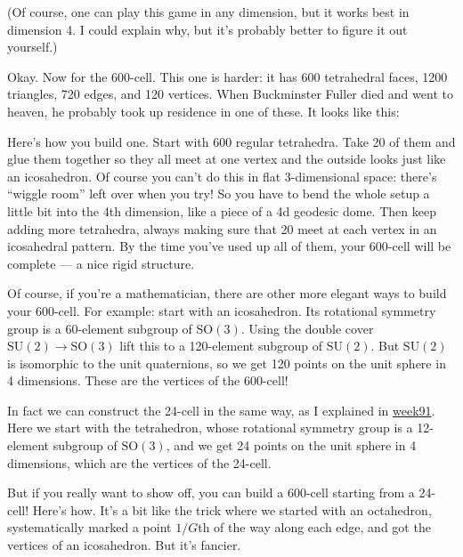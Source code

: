 \documentclass{article}
\def\tightlist{}
\renewcommand{\texttt}[1]{%
  \begingroup
  \ttfamily
  \begingroup\lccode`~=`/\lowercase{\endgroup\def~}{/\discretionary{}{}{}}%
  \begingroup\lccode`~=`[\lowercase{\endgroup\def~}{[\discretionary{}{}{}}%
  \begingroup\lccode`~=`.\lowercase{\endgroup\def~}{.\discretionary{}{}{}}%
  \catcode`/=\active\catcode`[=\active\catcode`.=\active
  \scantokens{#1\noexpand}%
  \endgroup
}
\begin{document}
(Of course, one can play this game in any dimension, but it works best
in dimension 4. I could explain why, but it's probably better to figure
it out yourself.)

Okay. Now for the 600-cell. This one is harder: it has 600 tetrahedral
faces, 1200 triangles, 720 edges, and 120 vertices. When Buckminster
Fuller died and went to heaven, he probably took up residence in one of
these. It looks like this:


Here's how you build one. Start with 600 regular tetrahedra. Take 20 of
them and glue them together so they all meet at one vertex and the
outside looks just like an icosahedron. Of course you can't do this in
flat 3-dimensional space: there's ``wiggle room'' left over when you
try! So you have to bend the whole setup a little bit into the 4th
dimension, like a piece of a 4d geodesic dome. Then keep adding more
tetrahedra, always making sure that 20 meet at each vertex in an
icosahedral pattern. By the time you've used up all of them, your
600-cell will be complete --- a nice rigid structure.

Of course, if you're a mathematician, there are other more elegant ways
to build your 600-cell. For example: start with an icosahedron. Its
rotational symmetry group is a 60-element subgroup of
\(\mathrm{SO}(3)\). Using the double cover \(\mathrm{SU}(2) \to \mathrm{SO}(3)\) lift this to a 120-element subgroup of
\(\mathrm{SU}(2)\). But \(\mathrm{SU}(2)\) is isomorphic to the unit
quaternions, so we get 120 points on the unit sphere in 4 dimensions.
These are the vertices of the 600-cell!

In fact we can construct the 24-cell in the same way, as I explained in
\href{week91.html}{week91}. Here we start with the tetrahedron, whose
rotational symmetry group is a 12-element subgroup of
\(\mathrm{SO}(3)\), and we get 24 points on the unit sphere in 4
dimensions, which are the vertices of the 24-cell.

But if you really want to show off, you can build a 600-cell starting
from a 24-cell! Here's how. It's a bit like the trick where we started
with an octahedron, systematically marked a point \(1/G\)th of the way
along each edge, and got the vertices of an icosahedron. But it's
fancier.
\end{document}
